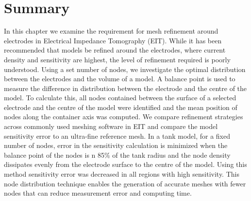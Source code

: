%

\section{Summary}
In this chapter we examine the requirement for mesh refinement around 
electrodes in Electrical Impedance Tomography (EIT). 
While it has been recommended that  models be refined around the electrodes, where current
density and sensitivity are highest,  the level of refinement required is poorly understood. 
Using a set number of nodes, we investigate the optimal distribution 
between the electrodes and 
the volume of a model. 
A balance point is used to measure the difference in distribution between the electrode and the centre of
the model.
To calculate this, all nodes contained between the surface of a selected electrode and the centre of the model 
were identified and the mean position of nodes along the container axis was computed. 
We compare refinement strategies across commonly used meshing software in EIT and compare the 
model sensitivity error to an ultra-fine reference mesh. 
In a tank model, for a fixed number of nodes, error in the sensitivity calculation is minimized 
when the balance point of the nodes is n  85\% of the tank radius and the node density dissipates evenly 
from the electrode surface to the centre of the model. Using this method sensitivity error was decreased 
in all regions with high sensitivity. This node distribution technique  enables the generation  of accurate 
meshes with fewer nodes that can reduce measurement error and computing time. 
